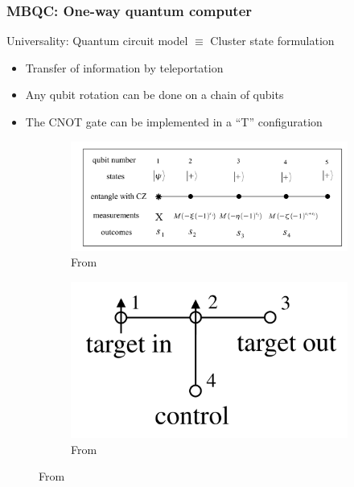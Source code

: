 \documentclass{beamer}
\theoremstyle{definition}
\begin{document}
\begin{frame}
\frametitle{MBQC: One-way quantum computer}

Universality: Quantum circuit model $\equiv$ Cluster state formulation

\begin{itemize}
	\item Transfer of information by teleportation
	\item Any qubit rotation can be done on a chain of qubits
	\item The CNOT gate can be implemented in a ``T'' configuration
\end{itemize}

\begin{figure}[!htb]
	\begin{subfigure}{.5\textwidth}
		\centering
		\includegraphics[scale=0.15]{rotate}
		\caption{From \cite{jozsa}}
	\end{subfigure}%
	\begin{subfigure}{.5\textwidth}
		\centering
		\includegraphics[scale=0.15]{CNOT}
		\caption{From \cite{MBQC}}
	\end{subfigure}
	
	
\end{figure}






\end{frame}
\end{document}

